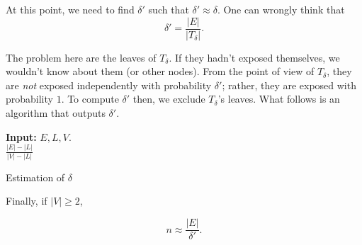 At this point, we need to find $\delta'$ such that $\delta' \approx \delta$. One can wrongly think that
\begin{equation}
	\delta' = \frac{|E|}{|T_\delta|}.
\end{equation}

The problem here are the leaves of $T_\delta$. If they hadn't exposed themselves, we wouldn't know about them (or other nodes). From the point of view of $T_\delta$, they are \emph{not} exposed independently with probability $\delta'$; rather, they are exposed with probability $1$. To compute $\delta'$ then, we exclude $T_\delta$'s leaves. What follows is an algorithm that outputs $\delta'$.

\begin{algorithm}
\textbf{Input:} $E, L, V$.\\
\Return $\frac{|E| - |L|}{|V|-|L|}$

\caption{Estimation of $\delta$}
\end{algorithm}

Finally, if $|V| \geq 2$,

\begin{equation}
	 n \approx \frac{|E|}{\delta'}.
\end{equation}

